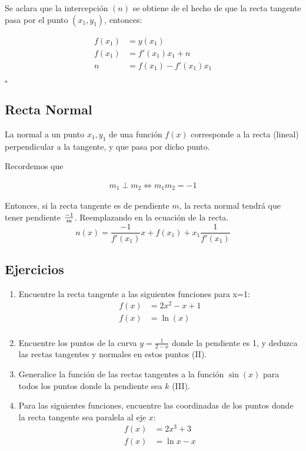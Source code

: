 \documentclass[spanish,12pt]{article}
\begin{document}
Se aclara que la intercepción $(n)$ se obtiene de el hecho de que la recta tangente pasa por el punto $(x_1,y_1)$, entonces:

\begin{align*}
    f(x_1)&=y(x_1)\\
    f(x_1)&=f'(x_1)x_1+n\\
    n&=f(x_1)-f'(x_1)x_1
\end{align*}

\hfill $\square$

\subsection{Recta Normal}

La normal a un punto $x_1,y_1$ de una función $f(x)$ corresponde a la recta (lineal) perpendicular a la tangente, y que pasa por dicho punto.

Recordemos que 

\begin{align*}
    m_1 \perp m_2 \iff m_1m_2=-1
\end{align*}

Entonces, si la recta tangente es de pendiente $m$, la recta normal tendrá que tener pendiente $-1\over m$. Reemplazando en la ecuación de la recta. 
$$n(x)=\frac{-1}{f'(x_1)}x+f(x_1)+x_1\frac{1}{f'(x_1)}$$


\subsection{Ejercicios}
\begin{enumerate}[1)]
    \item Encuentre la recta tangente a las siguientes funciones para x=1:
\begin{align*}
    f(x)&=2x^2-x+1\tag{I\footnotemark}\\
    f(x)&=\ln(x)\tag{I}\\
\end{align*}
    \item  Encuentre los puntos de la curva $y=\frac{1}{2-x}$ donde la pendiente es 1, y deduzca las rectas tangentes y normales en estos puntos (II).
    \item Generalice la función de las rectas tangentes a la función $\sin(x)$ para todos los puntos donde la pendiente sea $k$ (III).
    \item Para las siguientes funciones, encuentre las coordinadas de los puntos donde la recta tangente sea paralela al eje $x$:
\begin{align*}
    f(x)&=2x^3+3\tag{I}\\
    f(x)&=\ln{x}-x\tag{II}
\end{align*}
\end{enumerate}
\end{document}
